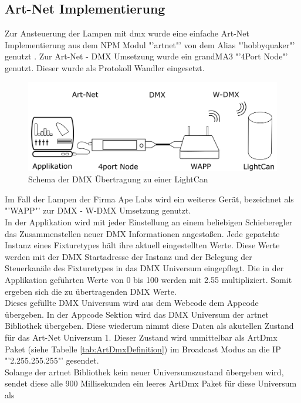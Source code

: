 \documentclass[11pt]{scrartcl}
\begin{document}
\subsection{Art-Net Implementierung}
Zur Ansteuerung der Lampen mit \ac{dmx} wurde eine einfache Art-Net Implementierung aus dem NPM Modul "'artnet"' von dem Alias "'hobbyquaker"' genutzt
\cite{artnetPackage}. Zur Art-Net - DMX Umsetzung wurde ein grandMA3 "'4Port Node"' genutzt. Dieser wurde als Protokoll Wandler eingesetzt.\\
\begin{figure}[H]
    \begin{center}
        \includegraphics[width=.9\textwidth]{images/Data_transmission_scheme.png}
    \end{center}
    \caption{Schema der DMX Übertragung zu einer LightCan}\label{fig:dataScheme}
\end{figure}
\noindent
Im Fall der Lampen der Firma Ape Labs wird ein weiteres Gerät, bezeichnet als "'WAPP"' zur DMX - W-DMX Umsetzung genutzt.\\
In der Applikation wird mit jeder Einstellung an einem beliebigen Schieberegler das Zusammenstellen neuer DMX Informationen angestoßen. Jede gepatchte
Instanz eines Fixturetypes hält ihre aktuell eingestellten Werte. Diese Werte werden mit der DMX Startadresse der Instanz und der Belegung der Steuerkanäle
des Fixturetypes in das DMX Universum eingepflegt. Die in der Applikation geführten Werte von 0 bis 100 werden mit 2.55 multipliziert. Somit ergeben sich die
zu übertragenden DMX Werte.\\
Dieses gefüllte DMX Universum wird aus dem Webcode dem Appcode übergeben. In der Appcode Sektion wird das DMX Universum der artnet Bibliothek übergeben. Diese
wiederum nimmt diese Daten als akutellen Zustand für das Art-Net Universum 1. Dieser Zustand wird unmittelbar als ArtDmx Paket (siehe Tabelle \ref{tab:ArtDmxDefinition})
im Broadcast Modus an die IP "'2.255.255.255"' gesendet.\\
Solange der artnet Bibliothek kein neuer Universumszustand übergeben wird, sendet diese alle 900 Millisekunden ein leeres ArtDmx Paket für diese Universum als
\end{document}
